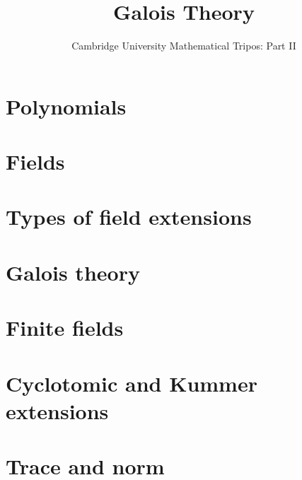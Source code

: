 \documentclass{article}
\title{Galois Theory}
\author{Cambridge University Mathematical Tripos: Part II}
\begin{document}
\maketitle

\tableofcontentsnewpage{}

\section{Polynomials}

\section{Fields}

\section{Types of field extensions}

\section{Galois theory}

\section{Finite fields}

\section{Cyclotomic and Kummer extensions}

\section{Trace and norm}

\end{document}
